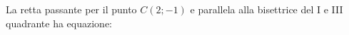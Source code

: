 La retta passante per il punto \(\displaystyle C(2;-1)\) e parallela alla bisettrice 
del I e III quadrante ha equazione: